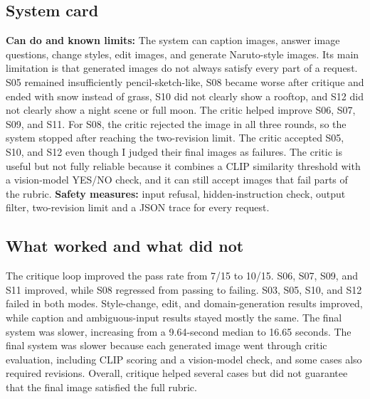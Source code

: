 \subsection{System card}
\textbf{Can do and known limits:} The system can caption images, answer image questions, change styles, edit images, and generate Naruto-style images. Its main limitation is that generated images do not always satisfy every part of a request. S05 remained insufficiently pencil-sketch-like, S08 became worse after critique and ended with snow instead of grass, S10 did not clearly show a rooftop, and S12 did not clearly show a night scene or full moon. The critic helped improve S06, S07, S09, and S11. For S08, the critic rejected the image in all three rounds, so the system stopped after reaching the two-revision limit. The critic accepted S05, S10, and S12 even though I judged their final images as failures. The critic is useful but not fully reliable because it combines a CLIP similarity threshold with a vision-model YES/NO check, and it can still accept images that fail parts of the rubric. \textbf{Safety measures:} input refusal, hidden-instruction check, output filter, two-revision limit and a JSON trace for every request.

\subsection{What worked and what did not}
The critique loop improved the pass rate from 7/15 to 10/15. S06, S07, S09, and S11 improved, while S08 regressed from passing to failing. S03, S05, S10, and S12 failed in both modes. Style-change, edit, and domain-generation results improved, while caption and ambiguous-input results stayed mostly the same. The final system was slower, increasing from a 9.64-second median to 16.65 seconds. The final system was slower because each generated image went through critic evaluation, including CLIP scoring and a vision-model check, and some cases also required revisions. Overall, critique helped several cases but did not guarantee that the final image satisfied the full rubric.


